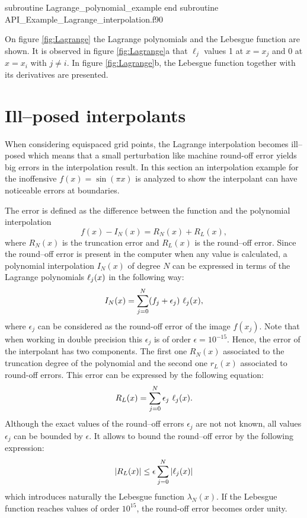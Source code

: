 \vspace{0.5cm} 
         {subroutine Lagrange_polynomial_example}
         {end subroutine}
         {API_Example_Lagrange_interpolation.f90}
         

On figure \ref{fig:Lagrange} the Lagrange polynomials and the Lebesgue function are shown. 
It is observed in figure \ref{fig:Lagrange}a that  $\ell_j$ values 1 at $x = x_j$ and  0 at $ x = x_i $ with  $j \ne i$.
In figure \ref{fig:Lagrange}b, the Lebesgue function together with its derivatives are presented. 





\section{Ill--posed interpolants} 
When considering equispaced grid points, the Lagrange interpolation becomes ill--posed which means that a small perturbation like machine round-off error yields big errors in the interpolation result. 
In this section an interpolation example for the inoffensive $ f(x) = \sin (\pi x) $ is analyzed to show the interpolant can have  noticeable errors at boundaries. 

The error is defined as the difference between the function and the polynomial interpolation 
$$
    f(x) - I_N(x) = R_N(x) + R_L(x),
$$  
where $ R_N(x)$ is the truncation error and $ R_L(x) $ is the round--off error. 
Since the round--off error is present in the computer when any value is calculated, a 
polynomial interpolation $ I_N(x) $ of degree $ N $ can be expressed in terms of the Lagrange polynomials $\ell_j(x)$  in the following way: 
$$
    I_N(x) = \sum _{j=0} ^{N} ( f_j + \epsilon_j )  \ \lagrange_j(x), 
$$
where $ \epsilon_j $ can be considered as the round-off error of the image $ f(x_j) $. Note that when working in double precision 
this $ \epsilon _j $ is of order $ \epsilon = 10 ^{-15} $.
Hence, the error of the interpolant has two components. The first one $ R_N(x) $ associated to the truncation degree of the polynomial and the 
second one $ r_L(x)$ associated to round-off errors. This error can be expressed by the following equation: 
$$
    R_L(x) = \sum _{j=0} ^{N}  \epsilon_j  \ \ell_j(x). 
$$
Although the exact values of the round--off errors $ \epsilon_j $ are not not known, all values $\epsilon_j $  can be  bounded by $\epsilon$. It allows to bound the round--off error by the following expression: 
$$
     |R_L(x)| \le  \epsilon \sum _{j=0} ^{N}  | \ell_j(x) | 
$$  
which introduces naturally the Lebesgue function $\lambda_N(x)$. If the Lebesgue function reaches values of order  $  10 ^{15} $, the round-off error becomes order unity. 

